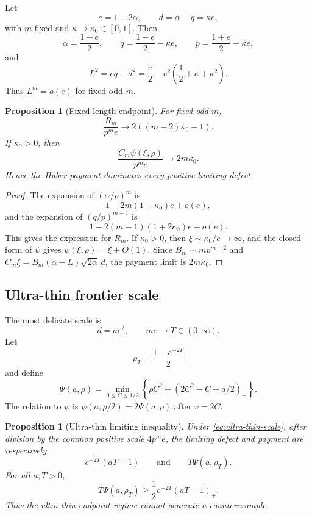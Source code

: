 \documentclass[11pt]{article}
\newtheorem{proposition}[theorem]{Proposition}
\newcommand{\pos}[1]{\left(#1\right)_{+}}
\begin{document}
Let
\[
        e=1-2\alpha,
        \qquad d=\alpha-q=\kappa e,
\]
with $m$ fixed and $\kappa\to\kappa_0\in[0,1]$.  Then
\[
        \alpha=\frac{1-e}{2},
        \qquad
        q=\frac{1-e}{2}-\kappa e,
        \qquad
        p=\frac{1+e}{2}+\kappa e,
\]
and
\[
        L^2=eq-d^2
        =\frac e2-e^2\left(\frac12+\kappa+\kappa^2\right).
\]
Thus $L^m=o(e)$ for fixed odd $m$.

\begin{proposition}[Fixed-length endpoint]\label{prop:fixed-length}
For fixed odd $m$,
\[
        \frac{R_m}{p^me}\to 2((m-2)\kappa_0-1).
\]
If $\kappa_0>0$, then
\[
        \frac{C_m\psi(\xi,\rho)}{p^me}\to 2m\kappa_0.
\]
Hence the Huber payment dominates every positive limiting defect.
\end{proposition}

\begin{proof}
The expansion of $(\alpha/p)^m$ is
\[
        1-2m(1+\kappa_0)e+o(e),
\]
and the expansion of $(q/p)^{m-1}$ is
\[
        1-2(m-1)(1+2\kappa_0)e+o(e).
\]
This gives the expression for $R_m$.  If $\kappa_0>0$, then
$\xi\sim\kappa_0/e\to\infty$, and the closed form of $\psi$ gives
$\psi(\xi,\rho)=\xi+O(1)$.  Since $B_m\sim mp^{m-2}$ and
$C_m\xi=B_m(\alpha-L)\sqrt{2\alpha}\,d$, the payment limit is
$2m\kappa_0$.
\end{proof}

\subsection{Ultra-thin frontier scale}

The most delicate scale is
\begin{equation}\label{eq:ultra-thin-scale}
        d=a e^2,
        \qquad me\to T\in(0,\infty).
\end{equation}
Let
\[
        \rho_T=\frac{1-e^{-2T}}2
\]
and define
\[
        \Psi(a,\rho)=
        \min_{0\le C\le1/2}
        \left\{
        \rho C^2+\pos{2C^2-C+a/2}
        \right\}.
\]
The relation to $\psi$ is $\psi(a,\rho/2)=2\Psi(a,\rho)$ after $v=2C$.

\begin{proposition}[Ultra-thin limiting inequality]\label{prop:ultra-thin}
Under \eqref{eq:ultra-thin-scale}, after division by the common positive
scale $4p^me$, the limiting defect and payment are respectively
\[
        e^{-2T}(aT-1)
        \qquad\text{and}\qquad
        T\Psi(a,\rho_T).
\]
For all $a,T>0$,
\begin{equation}\label{eq:ultra-thin-ineq}
        T\Psi(a,\rho_T)
        \ge \frac12 e^{-2T}\pos{aT-1}.
\end{equation}
Thus the ultra-thin endpoint regime cannot generate a counterexample.
\end{proposition}
\end{document}
